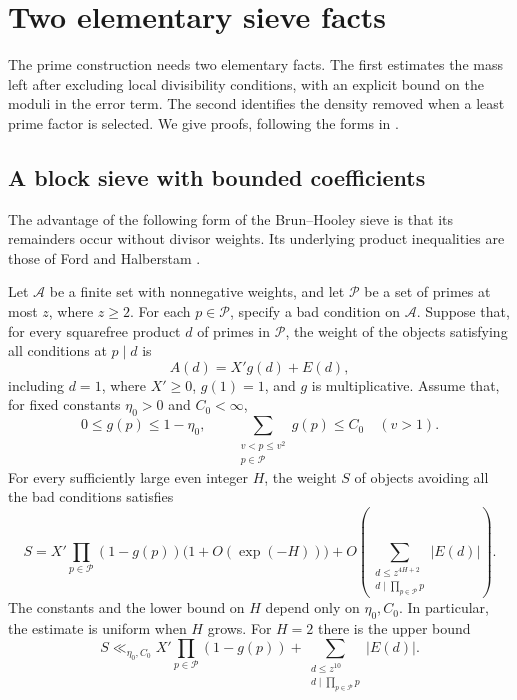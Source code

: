 \section{Two elementary sieve facts}\label{sec:sieve}

The prime construction needs two elementary facts. The first estimates
the mass left after excluding local divisibility conditions, with an
explicit bound on the moduli in the error term. The second identifies
the density removed when a least prime factor is selected. We give
proofs, following the forms in \cite[Lemmas~2.9 and~7.4]{BlockPaper}.

\subsection{A block sieve with bounded coefficients}

The advantage of the following form of the Brun--Hooley sieve is that
its remainders occur without divisor weights. Its underlying product
inequalities are those of Ford and Halberstam
\cite[Section~1, Lemma~1]{FordHalberstam2000}.

\begin{lemma}\label{lem:block}
Let $\mathcal A$ be a finite set with nonnegative weights, and let
$\mathcal P$ be a set of primes at most $z$, where $z\ge2$.
For each $p\in\mathcal P$, specify a bad condition on $\mathcal A$.
Suppose that, for every squarefree product $d$ of primes in
$\mathcal P$, the weight of the objects satisfying all conditions
at $p\mid d$ is
\[
 A(d)=X'g(d)+E(d),
\]
including $d=1$, where $X'\ge0$, $g(1)=1$, and $g$ is multiplicative.
Assume that, for fixed constants $\eta_0>0$ and $C_0<\infty$,
\begin{equation}\label{eq:block-hypotheses}
 0\le g(p)\le1-\eta_0,
 \qquad
 \sum_{\substack{v<p\le v^2\\p\in\mathcal P}}g(p)\le C_0
 \quad(v>1).
\end{equation}
For every sufficiently large even integer $H$, the weight $S$ of
objects avoiding all the bad conditions satisfies
\begin{equation}\label{eq:block-sieve}
 S=X'\prod_{p\in\mathcal P}(1-g(p))
       \bigl(1+O(\exp(-H))\bigr)
   +O\left(\sum_{\substack{d\le z^{4H+2}\\d\mid\prod_{p\in\mathcal P}p}}
                  |E(d)|\right).
\end{equation}
The constants and the lower bound on $H$ depend only on
$\eta_0,C_0$. In particular, the estimate is uniform when $H$ grows.
For $H=2$ there is the upper bound
\begin{equation}\label{eq:block-sieve-upper}
 S\ll_{\eta_0,C_0}X'\prod_{p\in\mathcal P}(1-g(p))
       +\sum_{\substack{d\le z^{10}\\d\mid\prod_{p\in\mathcal P}p}}
                    |E(d)|.
\end{equation}
\end{lemma}

